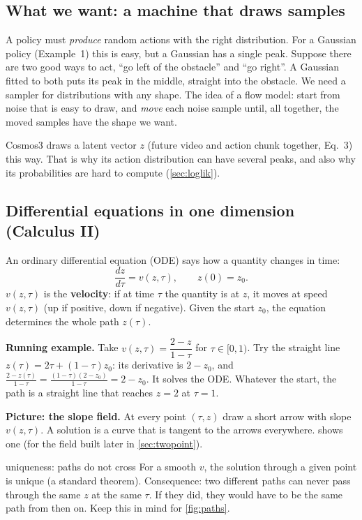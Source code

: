 \documentclass[11pt,a4paper]{article}
\begin{document}
\subsection{What we want: a machine that draws samples}
A policy must \emph{produce} random actions with the right distribution. For a Gaussian policy (Example~1) this is easy, but a Gaussian has a single peak. Suppose there are two good ways to act, ``go left of the obstacle'' and ``go right''. A Gaussian fitted to both puts its peak in the middle, straight into the obstacle. We need a sampler for distributions with any shape. The idea of a flow model: start from noise that is easy to draw, and \emph{move} each noise sample until, all together, the moved samples have the shape we want.

\begin{paperlink}
Cosmos3 draws a latent vector $z$ (future video and action chunk together, Eq.~3) this way. That is why its action distribution can have several peaks, and also why its probabilities are hard to compute (\cref{sec:loglik}).
\end{paperlink}

\subsection{Differential equations in one dimension (Calculus II)}
An ordinary differential equation (ODE) says how a quantity changes in time:
\begin{equation}
\frac{dz}{d\tau}=v(z,\tau),\qquad z(0)=z_0 .
\label{eq:ode1}
\end{equation}
$v(z,\tau)$ is the \textbf{velocity}: if at time $\tau$ the quantity is at $z$, it moves at speed $v(z,\tau)$ (up if positive, down if negative). Given the start $z_0$, the equation determines the whole path $z(\tau)$.

\textbf{Running example.} Take $v(z,\tau)=\dfrac{2-z}{1-\tau}$ for $\tau\in[0,1)$. Try the straight line $z(\tau)=2\tau+(1-\tau)z_0$: its derivative is $2-z_0$, and $\frac{2-z(\tau)}{1-\tau}=\frac{(1-\tau)(2-z_0)}{1-\tau}=2-z_0$. It solves the ODE. Whatever the start, the path is a straight line that reaches $z=2$ at $\tau=1$.

\textbf{Picture: the slope field.} At every point $(\tau,z)$ draw a short arrow with slope $v(z,\tau)$. A solution is a curve that is tangent to the arrows everywhere.  shows one (for the field built later in \cref{sec:twopoint}).

\begin{newc}{uniqueness: paths do not cross}
For a smooth $v$, the solution through a given point is unique (a standard theorem). Consequence: two different paths can never pass through the same $z$ at the same $\tau$. If they did, they would have to be the same path from then on. Keep this in mind for \cref{fig:paths}.
\end{newc}
\end{document}
